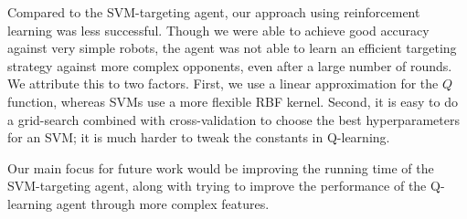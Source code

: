 \documentclass{article}
\theoremstyle{plain}
\theoremstyle{definition}
\theoremstyle{remark}
\begin{document}
Compared to the SVM-targeting agent, our approach using reinforcement learning was less successful. Though we were able to achieve good accuracy against very simple robots, the agent was not able to learn an efficient targeting strategy against more complex opponents, even after a large number of rounds. We attribute this to two factors. First, we use a linear approximation for the $Q$ function, whereas SVMs use a more flexible RBF kernel. Second, it is easy to do a grid-search
combined with cross-validation to choose the best hyperparameters for an SVM; it is much harder to tweak the constants in Q-learning. 

Our main focus for future work would be improving the running time of the SVM-targeting agent, along with trying to improve the performance of the Q-learning agent through more complex features.



\end{document}
